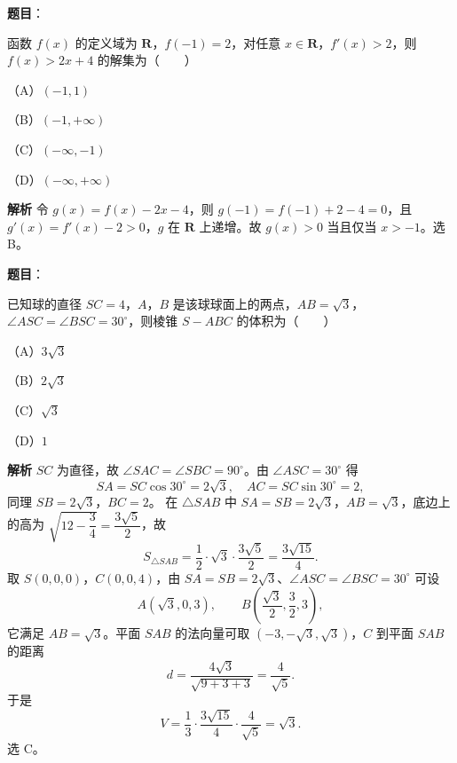 \begin{answer}

\textbf{题目}：

函数 $f(x)$ 的定义域为 $\mathbf R$，$f(-1)=2$，对任意 $x\in\mathbf R$，$f'(x)>2$，则 $f(x)>2x+4$ 的解集为\mbox{（　　）}

（A）$(-1,1)$

（B）$(-1,+\infty)$

（C）$(-\infty,-1)$

（D）$(-\infty,+\infty)$

\textbf{解析}
令 $g(x)=f(x)-2x-4$，则 $g(-1)=f(-1)+2-4=0$，且 $g'(x)=f'(x)-2>0$，$g$ 在 $\mathbf R$ 上递增。故 $g(x)>0$ 当且仅当 $x>-1$。选 B。


\end{answer}
\begin{answer}

\textbf{题目}：

已知球的直径 $SC=4$，$A$，$B$ 是该球球面上的两点，$AB=\sqrt3$，$\angle ASC=\angle BSC=30^\circ$，则棱锥 $S-ABC$ 的体积为\mbox{（　　）}

（A）$3\sqrt3$

（B）$2\sqrt3$

（C）$\sqrt3$

（D）$1$

\textbf{解析}
$SC$ 为直径，故 $\angle SAC=\angle SBC=90^\circ$。由 $\angle ASC=30^\circ$ 得
\nopagebreak[4]
\[SA=SC\cos30^\circ=2\sqrt3,\quad AC=SC\sin30^\circ=2,\]
同理 $SB=2\sqrt3$，$BC=2$。
在 $\triangle SAB$ 中 $SA=SB=2\sqrt3$，$AB=\sqrt3$，底边上的高为 $\sqrt{12-\dfrac34}=\dfrac{3\sqrt5}2$，故
\nopagebreak[4]
\[S_{\triangle SAB}=\frac12\cdot\sqrt3\cdot\frac{3\sqrt5}2=\frac{3\sqrt{15}}4.\]
取 $S(0,0,0)$，$C(0,0,4)$，由 $SA=SB=2\sqrt3$、$\angle ASC=\angle BSC=30^\circ$ 可设
\nopagebreak[4]
\[A(\sqrt3,0,3),\qquad B\left(\frac{\sqrt3}2,\frac32,3\right),\]
它满足 $AB=\sqrt3$。平面 $SAB$ 的法向量可取 $(-3,-\sqrt3,\sqrt3)$，$C$ 到平面 $SAB$ 的距离
\nopagebreak[4]
\[d=\frac{4\sqrt3}{\sqrt{9+3+3}}=\frac4{\sqrt5}.\]
于是
\nopagebreak[4]
\[V=\frac13\cdot\frac{3\sqrt{15}}4\cdot\frac4{\sqrt5}=\sqrt3.\]
选 C。


\end{answer}
